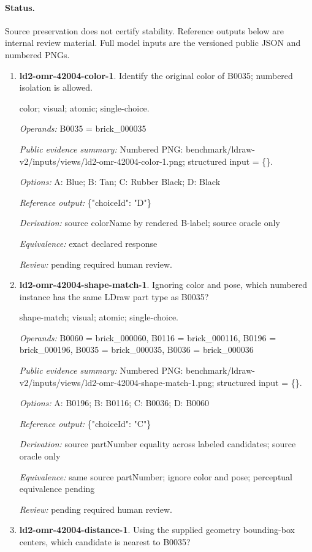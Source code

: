 \paragraph{Status.}Source preservation does not certify stability. Reference outputs below are internal review material. Full model inputs are the versioned public JSON and numbered PNGs.
\begin{enumerate}
\item \textbf{ld2-omr-42004-color-1}. Identify the original color of B0035; numbered isolation is allowed.
\par{\small color; visual; atomic; single-choice.\par\textit{Operands:} B0035 = brick\_000035\par\textit{Public evidence summary:} Numbered PNG: benchmark/ldraw-v2/inputs/views/ld2-omr-42004-color-1.png; structured input = \{\}.\par\textit{Options:} A: Blue; B: Tan; C: Rubber Black; D: Black\par\textit{Reference output:} \{"choiceId": "D"\}\par\textit{Derivation:} source colorName by rendered B-label; source oracle only\par\textit{Equivalence:} exact declared response\par\textit{Review:} pending required human review.}
\item \textbf{ld2-omr-42004-shape-match-1}. Ignoring color and pose, which numbered instance has the same LDraw part type as B0035?
\par{\small shape-match; visual; atomic; single-choice.\par\textit{Operands:} B0060 = brick\_000060, B0116 = brick\_000116, B0196 = brick\_000196, B0035 = brick\_000035, B0036 = brick\_000036\par\textit{Public evidence summary:} Numbered PNG: benchmark/ldraw-v2/inputs/views/ld2-omr-42004-shape-match-1.png; structured input = \{\}.\par\textit{Options:} A: B0196; B: B0116; C: B0036; D: B0060\par\textit{Reference output:} \{"choiceId": "C"\}\par\textit{Derivation:} source partNumber equality across labeled candidates; source oracle only\par\textit{Equivalence:} same source partNumber; ignore color and pose; perceptual equivalence pending\par\textit{Review:} pending required human review.}
\item \textbf{ld2-omr-42004-distance-1}. Using the supplied geometry bounding-box centers, which candidate is nearest to B0035?

\end{enumerate}

